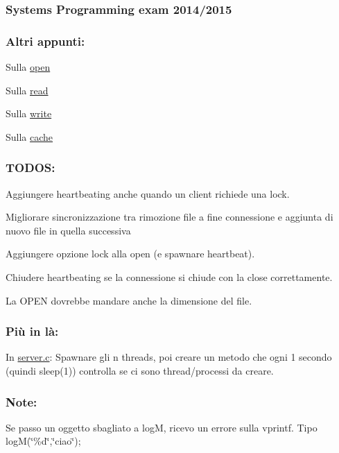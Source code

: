 \subsubsection*{Systems Programming exam 2014/2015}

\subsubsection*{Altri appunti\+:}


\begin{DoxyItemize}
\item Sulla \hyperlink{md_OPE}{open}
\item Sulla \hyperlink{md_READ}{read}
\item Sulla \hyperlink{md_WRITE}{write}
\item Sulla \hyperlink{md_Cache}{cache}
\end{DoxyItemize}

\subsubsection*{T\+O\+D\+O\+S\+:}


\begin{DoxyItemize}
\item Aggiungere heartbeating anche quando un client richiede una lock.
\item Migliorare sincronizzazione tra rimozione file a fine connessione e aggiunta di nuovo file in quella successiva
\item Aggiungere opzione lock alla open (e spawnare heartbeat).
\item Chiudere heartbeating se la connessione si chiude con la close correttamente.
\item La O\+P\+E\+N dovrebbe mandare anche la dimensione del file.
\end{DoxyItemize}

\subsubsection*{Più in là\+:}


\begin{DoxyItemize}
\item In \hyperlink{server_8c}{server.\+c}\+: Spawnare gli n threads, poi creare un metodo che ogni 1 secondo (quindi sleep(1)) controlla se ci sono thread/processi da creare.
\end{DoxyItemize}

\subsubsection*{Note\+:}


\begin{DoxyItemize}
\item Se passo un oggetto sbagliato a log\+M, ricevo un errore sulla vprintf. Tipo log\+M(\char`\"{}\%d\char`\"{},\char`\"{}ciao\char`\"{}); 
\end{DoxyItemize}